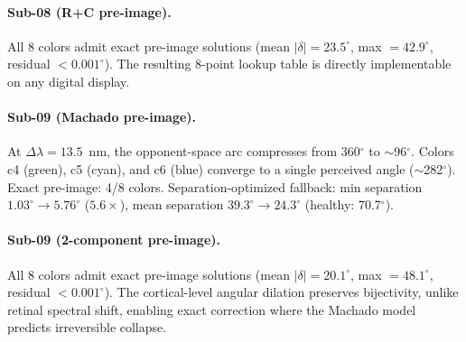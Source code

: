 \documentclass{article}
\begin{document}
\paragraph{Sub-08 (R+C pre-image).}
All 8 colors admit exact pre-image solutions (mean $|\delta| = 23.5^\circ$, max $= 42.9^\circ$, residual $< 0.001^\circ$).
The resulting 8-point lookup table is directly implementable on any digital display.

\paragraph{Sub-09 (Machado pre-image).}
At $\Delta\lambda = 13.5$~nm, the opponent-space arc compresses from 360$^\circ$ to $\sim$96$^\circ$.
Colors c4 (green), c5 (cyan), and c6 (blue) converge to a single perceived angle ($\sim$282$^\circ$).
Exact pre-image: 4/8 colors.
Separation-optimized fallback: min separation $1.03^\circ \to 5.76^\circ$ ($5.6\times$), mean separation $39.3^\circ \to 24.3^\circ$ (healthy: 70.7$^\circ$).

\paragraph{Sub-09 (2-component pre-image).}
All 8 colors admit exact pre-image solutions (mean $|\delta| = 20.1^\circ$, max $= 48.1^\circ$, residual $< 0.001^\circ$).
The cortical-level angular dilation preserves bijectivity, unlike retinal spectral shift, enabling exact correction where the Machado model predicts irreversible collapse.
\end{document}
